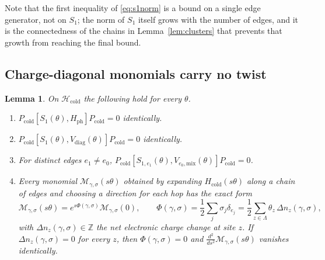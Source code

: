 \documentclass[11pt]{article}
\theoremstyle{plain}
\newtheorem{lemma}{Lemma}
\theoremstyle{definition}
\begin{document}
Note that the first inequality of \eqref{eq:s1norm} is a bound on a single edge
generator, not on $S_1$; the norm of $S_1$ itself grows with the number of edges,
and it is the connectedness of the chains in Lemma~\ref{lem:clusters} that
prevents that growth from reaching the final bound.

\subsection{Charge-diagonal monomials carry no twist}

\begin{lemma}\label{lem:cancel}
On $\mathcal{H}_{\mathrm{cold}}$ the following hold for every $\theta$.
\begin{enumerate}
\item\label{it:ph} $P_{\mathrm{cold}}[S_1(\theta),H_{\mathrm{ph}}]P_{\mathrm{cold}}=0$
identically.
\item\label{it:diag} $P_{\mathrm{cold}}[S_1(\theta),V_{\mathrm{diag}}(\theta)]P_{\mathrm{cold}}=0$
identically.
\item\label{it:edges} For distinct edges $e_1\ne e_0$,
$P_{\mathrm{cold}}[S_{1,e_1}(\theta),V_{e_0,\mathrm{mix}}(\theta)]P_{\mathrm{cold}}=0$.
\item\label{it:monomial} Every monomial
$\mathcal{M}_{\gamma,\sigma}(s\theta)$ obtained by expanding
$H_{\mathrm{cold}}(s\theta)$ along a chain of edges and choosing a direction for
each hop has the exact form
\begin{equation}\label{eq:monomial}
\mathcal{M}_{\gamma,\sigma}(s\theta)=e^{s\Phi(\gamma,\sigma)}\mathcal{M}_{\gamma,\sigma}(0),
\qquad
\Phi(\gamma,\sigma)=\frac{1}{2}\sum_{j}\sigma_j\delta_{e_j}
=\frac{1}{2}\sum_{z\in\Lambda}\theta_z\,\Delta n_z(\gamma,\sigma),
\end{equation}
with $\Delta n_z(\gamma,\sigma)\in\mathbb{Z}$ the net electronic charge change at
site $z$. If $\Delta n_z(\gamma,\sigma)=0$ for every $z$, then
$\Phi(\gamma,\sigma)=0$ and $\frac{d^{2}}{ds^{2}}\mathcal{M}_{\gamma,\sigma}(s\theta)$
vanishes identically.
\end{enumerate}
\end{lemma}
\end{document}
